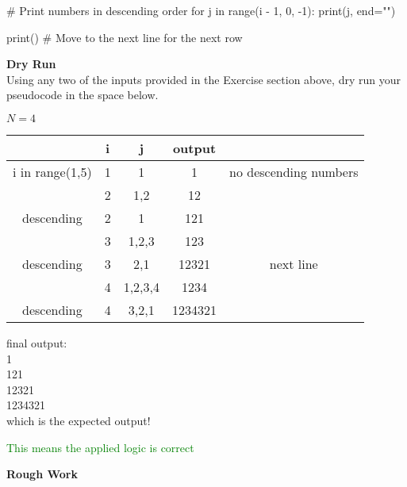 \documentclass[a4paper]{exam}
\newcommand\heading[1]{\textbf{#1}}
\begin{document}
\begin{questions}
\begin{python}
        # Print numbers in descending order
        for j in range(i - 1, 0, -1):
            print(j, end="")

        print()  # Move to the next line for the next row
  \end{python}
  \heading{Dry Run}\\
  Using any two of the inputs provided in the Exercise section above, dry run your pseudocode in the space below.

  $N = 4$

  \begin{tabular}{|c|c|c|c|c|}
    \hline
    \textbf{} & \textbf{i} & \textbf{j} & \textbf{output} & \textbf{} \\
    \hline
    i in range(1,5) & 1 & 1 & 1 & no descending numbers \\
    \hline
     & 2 & 1,2  & 12  \\
    \hline
    descending & 2 & 1 & 121 \\
    \hline
     & 3  & 1,2,3  & 123 \\
    \hline
     descending& 3 & 2,1 & 12321 & next line \\
     \hline
     & 4 & 1,2,3,4 & 1234  \\
     \hline
     descending& 4  & 3,2,1 & 1234321  \\
    \hline
\end{tabular}

final output: \\
1\\
121\\
12321\\
1234321\\ which is the expected output!

\textcolor{green}{This means the applied logic is correct}
  
  \newpage
  \centerline{\heading{Rough Work}}
\end{questions}
\end{document}
